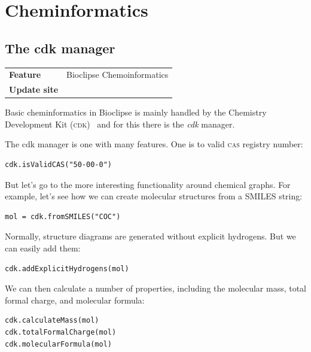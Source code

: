 \documentclass{book}
\renewcommand{\todo}[1]{{\color{white}\oldtodo{\textsf{#1}}}}
\begin{document}
\chapter{Cheminformatics}
\begin{refsection}


\section{The cdk manager}

\begin{tabular}{ll}
\textbf{Feature} & Bioclipse Chemoinformatics \\
\textbf{Update site} & \url{} \\
\end{tabular}

Basic cheminformatics in Bioclipse is mainly handled by the 
Chemistry Development Kit (\textsc{cdk})~\cite{Steinbeck2003,Steinbeck2006} and for this there 
is the \emph{cdk} manager.

The cdk manager is one with many features. One is to valid\todo{validate?} \textsc{cas}\todo{explain \textsc{cas}} registry number:

\begin{Verbatim}
cdk.isValidCAS("50-00-0")
\end{Verbatim}

But let's go to the more interesting functionality around chemical graphs.
For example, let's see how we can create molecular structures from a
SMILES string:

\begin{Verbatim}
mol = cdk.fromSMILES("COC")
\end{Verbatim}

Normally, structure diagrams are generated without explicit hydrogens.
But we can easily add them:

\begin{Verbatim}
cdk.addExplicitHydrogens(mol)
\end{Verbatim}

We can then calculate a number of properties, including the molecular 
mass, total formal charge, and
molecular formula:

\begin{Verbatim}
cdk.calculateMass(mol)
cdk.totalFormalCharge(mol)
cdk.molecularFormula(mol)
\end{Verbatim}


\end{refsection}
\end{document}
